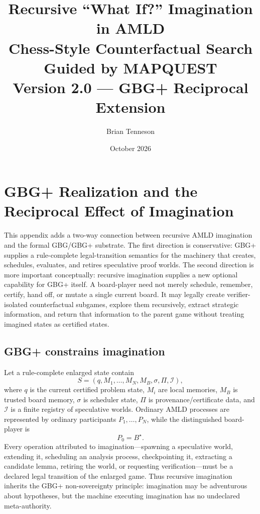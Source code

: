 \documentclass[11pt]{article}
\title{\textbf{Recursive ``What If?'' Imagination in AMLD}\\[0.4em]
\large Chess-Style Counterfactual Search Guided by MAPQUEST\\[0.4em]
\normalsize Version 2.0 --- GBG+ Reciprocal Extension}
\author{Brian Tenneson}
\date{October 2026}
\begin{document}


\appendix
\section{GBG+ Realization and the Reciprocal Effect of Imagination}

This appendix adds a two-way connection between recursive AMLD imagination and the formal GBG/GBG+ substrate.  The first direction is conservative: GBG+ supplies a rule-complete legal-transition semantics for the machinery that creates, schedules, evaluates, and retires speculative proof worlds.  The second direction is more important conceptually: recursive imagination supplies a new optional capability for GBG+ itself.  A board-player need not merely schedule, remember, certify, hand off, or mutate a single current board.  It may legally create verifier-isolated counterfactual subgames, explore them recursively, extract strategic information, and return that information to the parent game without treating imagined states as certified states.

\subsection{GBG+ constrains imagination}

Let a rule-complete enlarged state contain
\[
S=(q,M_1,\ldots,M_N,M_B,\sigma,\Pi,\mathcal I),
\]
where $q$ is the current certified problem state, $M_i$ are local memories, $M_B$ is trusted board memory, $\sigma$ is scheduler state, $\Pi$ is provenance/certificate data, and $\mathcal I$ is a finite registry of speculative worlds.  Ordinary AMLD processes are represented by ordinary participants $P_1,\ldots,P_N$, while the distinguished board-player is
\[
P_0=B^\star.
\]
Every operation attributed to imagination---spawning a speculative world, extending it, scheduling an analysis process, checkpointing it, extracting a candidate lemma, retiring the world, or requesting verification---must be a declared legal transition of the enlarged game.  Thus recursive imagination inherits the GBG+ non-sovereignty principle: imagination may be adventurous about hypotheses, but the machine executing imagination has no undeclared meta-authority.
\end{document}
